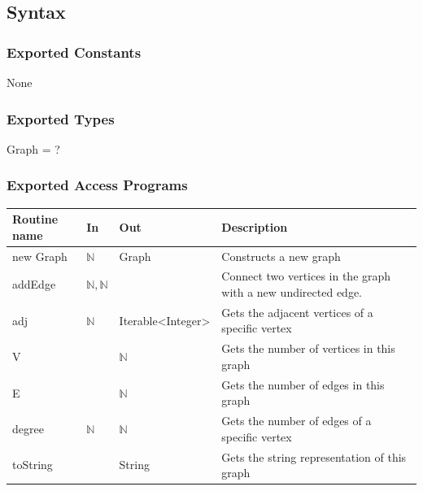 \documentclass[12pt]{article}
\begin{document}
                \subsection* {Syntax}
                \subsubsection* {Exported Constants}
                None
                
                \subsubsection* {Exported Types}
                
                Graph = ?
                
                \subsubsection* {Exported Access Programs}
                
                \begin{tabular}{| l | l | l | p{5cm} |}
                \hline
                \textbf{Routine name} & \textbf{In} & \textbf{Out} & \textbf{Description}\\
                \hline
                new Graph& $\mathbb{N}$ & Graph &  Constructs a new graph\\
                \hline
                 addEdge & $\mathbb{N}, \mathbb{N}$ & ~ & Connect two vertices in the graph with a new undirected edge.\\
                \hline
                 adj & $\mathbb{N}$ & Iterable<Integer>  & Gets the adjacent vertices of a specific vertex\\
                \hline
                 V & ~ & $\mathbb{N}$ & Gets the number of vertices in this graph\\
                \hline
                 E & ~ & $\mathbb{N}$ & Gets the number of edges in this graph\\
                \hline
                 degree & $\mathbb{N}$ & $\mathbb{N}$ & Gets the number of edges of a specific vertex\\
                \hline
                 toString & ~ & String &  Gets the string representation of this graph\\
                \hline
                \end{tabular}
                
\end{document}
